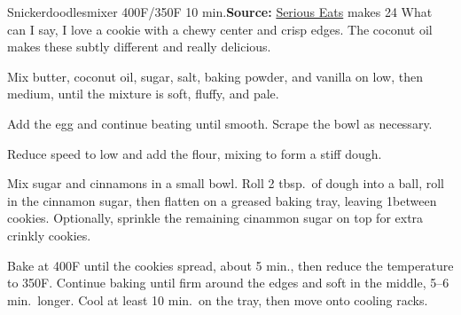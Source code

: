 \begin{recipe}{Snickerdoodles}{mixer \hfill 400\0F/350\0F \hfill 10 min.}{\textbf{Source:} \href{https://www.seriouseats.com/recipes/2016/01/new-fashioned-snickerdoodle-cookie-recipe.html}{Serious Eats} \hfill makes 24}
 \freeform What can I say, I love a cookie with a chewy center and crisp edges. The coconut oil makes these subtly different and really delicious.

 Mix butter, coconut oil, sugar, salt, baking powder, and vanilla on low, then medium, until the mixture is soft, fluffy, and pale.

 Add the egg and continue beating until smooth. Scrape the bowl as necessary.

 Reduce speed to low and add the flour, mixing to form a stiff dough.

 Mix sugar and cinnamons in a small bowl. Roll 2 tbsp.\ of dough into a ball, roll in the cinnamon sugar, then flatten on a greased baking tray, leaving 1\inch between cookies. Optionally, sprinkle the remaining cinammon sugar on top for extra crinkly cookies.

 \newstep Bake at 400\0F until the cookies spread, about 5 min., then reduce the temperature to 350\0F. Continue baking until firm around the edges and soft in the middle, 5--6 min.\ longer. Cool at least 10 min.\ on the tray, then move onto cooling racks.
\end{recipe}
